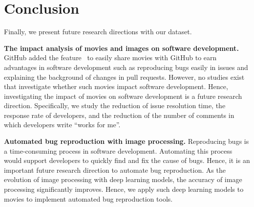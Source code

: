 \section{Conclusion}
\label{sec:conclusion}


Finally, we present future research directions with our dataset. 


\noindent
\textbf{The impact analysis of movies and images on software development.}
GitHub added the feature~\citep{github-video-blog} to easily 
share movies with GitHub to earn advantages 
in software development such as reproducing bugs easily in issues and 
explaining the background of changes in pull requests. 
However, no studies exist that investigate whether such movies 
impact software development. 
Hence, investigating the impact of movies on software development 
is a future research direction. 
Specifically, we study the reduction of issue resolution time, 
the response rate of developers, and 
the reduction of the number of comments 
in which developers write ``works for me''. 

\noindent
\textbf{Automated bug reproduction with image processing.}
Reproducing bugs is a time-consuming process 
in software development.
Automating this process would support developers 
to quickly find and fix the cause of bugs. 
Hence, it is an important future research direction 
to automate bug reproduction. 
As the evolution of image processing with deep learning models, 
the accuracy of image processing significantly improves. 
Hence, we apply such deep learning models to movies 
to implement automated bug reproduction tools. 